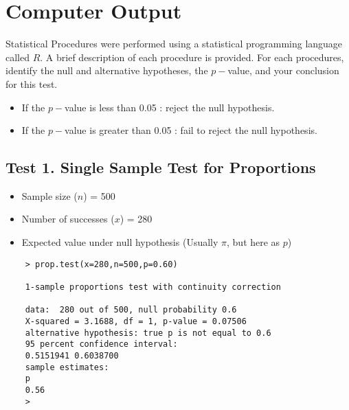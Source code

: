 \documentclass[]{report}
\begin{document}
	
\section{Computer Output}
Statistical Procedures were performed using a statistical programming language called $R$.
A brief description of each procedure is provided. For each procedures, identify the null and alternative hypotheses, the $p-$value, and your conclusion for this test.


\begin{itemize}
	\item If the $p-$value is less than 0.05 : reject the null hypothesis.
	\item If the $p-$value is greater than 0.05 : fail to reject the null hypothesis.
\end{itemize}
\subsection*{Test 1. Single Sample Test for Proportions}
\begin{itemize}
	\item Sample size ($n$) = 500
	\item Number of successes ($x$) = 280
	\item Expected value under null hypothesis (Usually $\pi$, but here as $p$)
\end{itemize}
\begin{framed}
	\begin{verbatim}
	> prop.test(x=280,n=500,p=0.60)
	
	1-sample proportions test with continuity correction
	
	data:  280 out of 500, null probability 0.6
	X-squared = 3.1688, df = 1, p-value = 0.07506
	alternative hypothesis: true p is not equal to 0.6
	95 percent confidence interval:
	0.5151941 0.6038700
	sample estimates:
	p 
	0.56 
	> 
	\end{verbatim}
\end{framed}
\newpage
\end{document}
